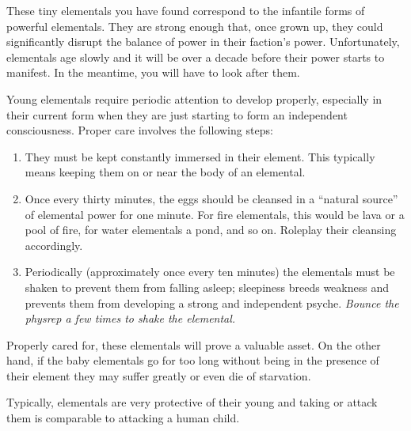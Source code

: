 \documentclass[green]{elementals}
\begin{document}
\name{\gElementalEggs{}}

These tiny elementals you have found correspond to the infantile forms of powerful elementals. They are strong enough that, once grown up, they could significantly disrupt the balance of power in their faction's power. Unfortunately, elementals age slowly and it will be over a decade before their power starts to manifest. In the meantime, you will have to look after them.

Young elementals require periodic attention to develop properly, especially in their current form when they are just starting to form an independent consciousness. Proper care involves the following steps:
\begin{enumerate}
  \item They must be kept constantly immersed in their element. This typically means keeping them on or near the body of an elemental.
  \item Once every thirty minutes, the eggs should be cleansed in a ``natural source'' of elemental power for one minute. For fire elementals, this would be lava or a pool of fire, for water elementals a pond, and so on. Roleplay their cleansing accordingly.
  \item Periodically (approximately once every ten minutes) the elementals must be shaken to prevent them from falling asleep; sleepiness breeds weakness and prevents them from developing a strong and independent psyche. \emph{Bounce the physrep a few times to shake the elemental.}
\end{enumerate}

Properly cared for, these elementals will prove a valuable asset. On the other hand, if the baby elementals go for too long without being in the presence of their element they may suffer greatly or even die of starvation.

Typically, elementals are very protective of their young and taking or attack them is comparable to attacking a human child.
\end{document}

